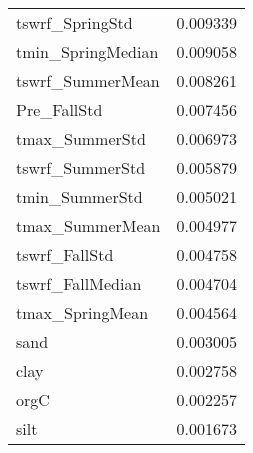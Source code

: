 \begin{tabular}{lr}
tswrf_SpringStd & 0.009339 \\
tmin_SpringMedian & 0.009058 \\
tswrf_SummerMean & 0.008261 \\
Pre_FallStd & 0.007456 \\
tmax_SummerStd & 0.006973 \\
tswrf_SummerStd & 0.005879 \\
tmin_SummerStd & 0.005021 \\
tmax_SummerMean & 0.004977 \\
tswrf_FallStd & 0.004758 \\
tswrf_FallMedian & 0.004704 \\
tmax_SpringMean & 0.004564 \\
sand & 0.003005 \\
clay & 0.002758 \\
orgC & 0.002257 \\
silt & 0.001673 \\
\bottomrule
\end{tabular}
